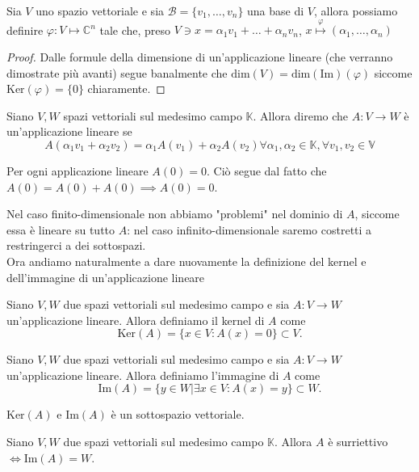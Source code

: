 \documentclass[12pt, twoside, italian, openany]{book}
\begin{document}
	\begin{prop}
		Sia $V$ uno spazio vettoriale e sia $\mathcal{B} = \{ v_1, \ldots, v_n \}$ una base di $V$, allora possiamo definire $\varphi: V \mapsto \mathbb{C}^n$ tale che, preso $V \ni x = \alpha_1 v_1 + \ldots + \alpha_n v_n$, $x \stackrel{\varphi}{\mapsto} (\alpha_1, \ldots, \alpha_n)$ 
	\end{prop}
	\begin{proof}
		Dalle formule della dimensione di un'applicazione lineare (che verranno dimostrate più avanti) segue banalmente che $\text{dim}(V) = \text{dim}(\text{Im})(\varphi)$ siccome $\text{Ker}(\varphi) = \{ 0 \}$ chiaramente.
	\end{proof}
	\begin{definition}
		Siano $V, W$ spazi vettoriali sul medesimo campo $\mathbb{K}$. Allora diremo che $A: V \to W$ è un'applicazione lineare se
		$$
		A(\alpha_1 v_1 + \alpha_2 v_2) = \alpha_1 A(v_1) + \alpha_2 A(v_2) \forall \alpha_1, \alpha_2 \in \mathbb{K}, \forall v_1, v_2 \in \mathbb{V}
		$$
	\end{definition}
	\begin{remark}
		Per ogni applicazione lineare $A(0) = 0$. Ciò segue dal fatto che $A(0) = A(0) + A(0) \implies A(0) = 0$.
	\end{remark}
	Nel caso finito-dimensionale non abbiamo "problemi" nel dominio di $A$, siccome essa è lineare su tutto $A$: nel caso infinito-dimensionale saremo costretti a restringerci a dei sottospazi. \\
	Ora andiamo naturalmente a dare nuovamente la definizione del kernel e dell'immagine di un'applicazione lineare
	\begin{definition}[kernel]
		Siano $V, W$ due spazi vettoriali sul medesimo campo e sia $A: V \to W$ un'applicazione lineare. Allora definiamo il kernel di $A$ come
		$$
		\text{Ker}(A) = \{ x \in V : A(x) = 0 \} \subset V.
		$$
	\end{definition}
	\begin{definition}[immagine]
		Siano $V, W$ due spazi vettoriali sul medesimo campo e sia $A: V \to W$ un'applicazione lineare. Allora definiamo l'immagine di $A$ come
		$$
		\text{Im}(A) = \{ y \in W | \exists x \in V : A(x) = y \} \subset W.
		$$
	\end{definition}
	\begin{prop}
		$\text{Ker}(A)$ e $\text{Im}(A)$ è un sottospazio vettoriale.
	\end{prop}
	\begin{definition}
		Siano $V, W$ due spazi vettoriali sul medesimo campo $\mathbb{K}$. Allora $A$ è surriettivo $\iff \text{Im}(A) = W$.
	\end{definition}
\end{document}
